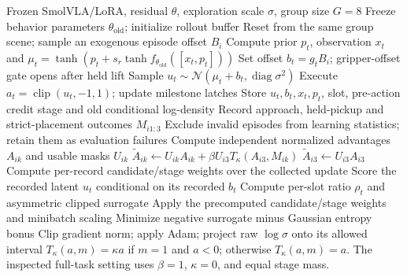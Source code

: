 \begin{algorithm}[t]
\caption{CDPR full-task RL with latent-action likelihood and protected stage credit}
\label{alg:cdpr_group_update}
\begin{algorithmic}[1]
\Require Frozen SmolVLA/LoRA, residual $\theta$, exploration scale $\sigma$, group size $G=8$
    \State Freeze behavior parameters $\theta_{\mathrm{old}}$; initialize rollout buffer
        \State Reset from the same group scene; sample an exogenous episode offset $B_i$
            \State Compute prior $p_t$, observation $x_t$ and $\mu_t=\tanh(p_t+s_r\tanh f_{\theta_{\mathrm{old}}}([x_t,p_t]))$
            \State Set offset $b_t=g_tB_i$; gripper-offset gate opens after held lift
            \State Sample $u_t\sim\mathcal N(\mu_t+b_t,\operatorname{diag}\sigma^2)$
            \State Execute $a_t=\operatorname{clip}(u_t,-1,1)$; update milestone latches
            \State Store $u_t,b_t,x_t,p_t$, slot, pre-action credit stage and old conditional log-density
        \EndFor
        \State Record approach, held-pickup and strict-placement outcomes $M_{i1:3}$
    \EndFor
    \State Exclude invalid episodes from learning statistics; retain them as evaluation failures
    \State Compute independent normalized advantages $A_{ik}$ and usable masks $U_{ik}$
            \State $\widetilde A_{ik}\gets U_{ik}A_{ik}+\beta U_{i3}T_\kappa(A_{i3},M_{ik})$
        \Else
            \State $\widetilde A_{i3}\gets U_{i3}A_{i3}$
        \EndIf
    \EndFor
    \State Compute per-record candidate/stage weights over the collected update
        \State Score the recorded latent $u_t$ conditional on its recorded $b_t$
        \State Compute per-slot ratio $\rho_t$ and asymmetric clipped surrogate
        \State Apply the precomputed candidate/stage weights and minibatch scaling
        \State Minimize negative surrogate minus Gaussian entropy bonus
        \State Clip gradient norm; apply Adam; project raw $\log\sigma$ onto its allowed interval
    \EndFor
\EndFor
\Statex $T_\kappa(a,m)=\kappa a$ if $m=1$ and $a<0$; otherwise $T_\kappa(a,m)=a$.
\Statex The inspected full-task setting uses $\beta=1$, $\kappa=0$, and equal stage mass.
\end{algorithmic}
\end{algorithm}
